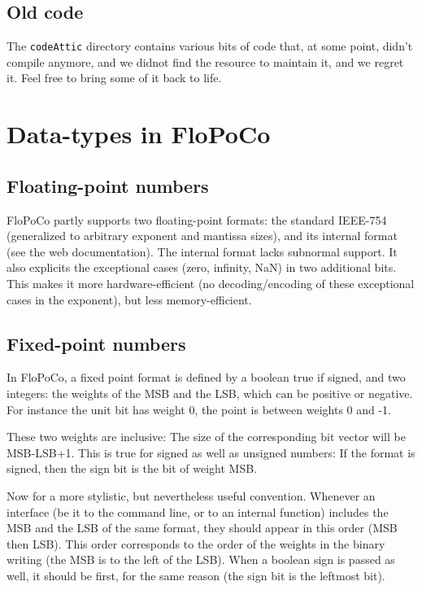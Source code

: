 \documentclass{article}
\begin{document}
\subsection{Old code}
The \texttt{codeAttic} directory contains various bits of code that, at some point, didn't compile anymore, and we didnot find the resource to maintain it, and we regret it. Feel free to bring some of it back to life.

\section{Data-types in FloPoCo\label{sec:data-types}}

\subsection{Floating-point numbers}

FloPoCo partly supports two floating-point formats: the standard IEEE-754 (generalized to arbitrary exponent and mantissa sizes), and its internal format (see the web documentation).
The internal format lacks subnormal support.
It also explicits the exceptional cases (zero, infinity, NaN) in two additional bits.
This makes it more hardware-efficient (no decoding/encoding of these exceptional cases in the exponent), but less memory-efficient.

\subsection{Fixed-point numbers}
In FloPoCo, a fixed point format is defined by a boolean true if signed, and two integers: the weights of the MSB and the LSB, which can be positive or negative. 
For instance the unit bit has weight 0, the point is between weights 0 and -1. 

These two weights are inclusive: The size of the corresponding bit vector will be MSB-LSB+1.
This is true for signed as well as unsigned numbers: If the format is signed, then the sign bit is the bit of weight MSB.


Now for a more stylistic, but nevertheless useful convention. Whenever an interface (be it to the command line, or to an internal function) includes the MSB and the LSB of the same format, they should appear in this order (MSB then LSB). This order corresponds to the order of the weights in the binary writing (the MSB is to the left of the LSB). 
When a boolean sign is passed as well, it should be first, for the same reason (the sign bit is the leftmost bit).
\end{document}
